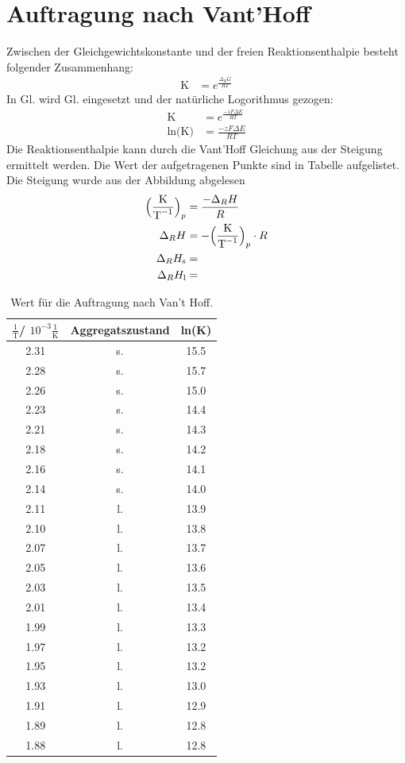 \documentclass[12pt,a4paper,titlepage,headinclude,bibtotoc]{scrartcl}
\begin{document}
\section{Auftragung nach Vant'Hoff}
Zwischen der Gleichgewichtskonstante und der freien Reaktionsenthalpie besteht folgender Zusammenhang:
\begin{align}
\text{K}&=e^{\frac{\Delta_R G}{RT}}
\end{align}
In Gl. wird Gl. eingesetzt und der natürliche Logorithmus gezogen:
\begin{align}
\text{K}&=e^{\frac{-zF\Delta E}{RT}}\\
\text{ln(K)}&=\frac{-zF\Delta E}{RT}
\end{align}
Die Reaktionsenthalpie kann durch die Vant'Hoff Gleichung aus der Steigung ermittelt werden. Die Wert der aufgetragenen Punkte sind in Tabelle aufgelistet. Die Steigung wurde aus der Abbildung abgelesen
\begin{align}
\Bigl(\frac{\text{K}}{\text{T}^{-1}}\Bigr)_p&=\frac{-\Delta_R H}{R}\\
\Delta_R H&=- \Bigl(\frac{\text{K}}{\text{T}^{-1}}\Bigr)_p\cdot R\\
\Delta_R H_{\text{s}}&=\\
\Delta_R H_{\text{l}}&=\\
\end{align}
\begin{table}[h]
\centering
\caption{Wert für die Auftragung nach Van't Hoff.}
\begin{tabular}{c|c|c}
$\frac{1}{\text{T}}$/ $10^{-3}\frac{1}{\text{K}}$ &Aggregatszustand& ln(K) \\
\hline
2.31 &  s. & 15.5\\
2.28 & s. & 15.7 \\
2.26 & s. &15.0\\
2.23 & s. &14.4\\
2.21 & s. &14.3\\
2.18 & s. &14.2\\
2.16 & s. &14.1\\
2.14 & s. &14.0\\
2.11 & l. &13.9\\
2.10 & l. &13.8\\
2.07 & l. &13.7\\
2.05  & l. &13.6\\
2.03 & l. &13.5\\
2.01 & l. &13.4\\
1.99 & l. &13.3\\
1.97 & l. &13.2\\
1.95 & l. &13.2\\
1.93 & l. &13.0\\
1.91 & l. &12.9\\
1.89 & l. &12.8\\
1.88 & l. &12.8\\
\end{tabular}
\end{table}
\end{document}
